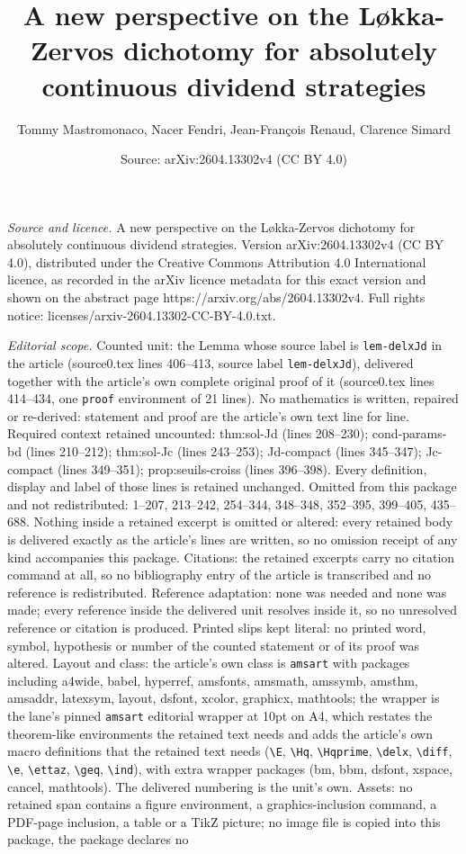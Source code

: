 \documentclass[10pt,a4paper]{amsart}
\title[A new perspective on the L{\o}kka-Zervos dichotomy for absol]{A new perspective on the L{\o}kka-Zervos dichotomy for absolutely continuous dividend strategies}
\author{Tommy Mastromonaco, Nacer Fendri, Jean-Fran\c{c}ois Renaud, Clarence Simard}
\date{Source: arXiv:2604.13302v4 (CC BY 4.0)}
\begin{document}
\maketitle

\noindent\emph{Source and licence.} A new perspective on the L{\o}kka-Zervos dichotomy for absolutely continuous dividend strategies. Version arXiv:2604.13302v4 (CC BY 4.0), distributed under the Creative Commons Attribution 4.0 International licence, as recorded in the arXiv licence metadata for this exact version and shown on the abstract page https://arxiv.org/abs/2604.13302v4. Full rights notice: licenses/arxiv-2604.13302-CC-BY-4.0.txt.\par\smallskip

\noindent\textit{Editorial scope.} Counted unit: the Lemma whose source label is \texttt{lem-delxJd} in the article (source0.tex lines 406--413, source label \texttt{lem-delxJd}), delivered together with the article's own complete original proof of it (source0.tex lines 414--434, one \texttt{proof} environment of 21 lines). No mathematics is written, repaired or re-derived: statement and proof are the article's own text line for line. Required context retained uncounted: thm:sol-Jd (lines 208--230); cond-params-bd (lines 210--212); thm:sol-Jc (lines 243--253); Jd-compact (lines 345--347); Jc-compact (lines 349--351); prop:seuils-croiss (lines 396--398). Every definition, display and label of those lines is retained unchanged. Omitted from this package and not redistributed: 1--207, 213--242, 254--344, 348--348, 352--395, 399--405, 435--688. Nothing inside a retained excerpt is omitted or altered: every retained body is delivered exactly as the article's lines are written, so no omission receipt of any kind accompanies this package. Citations: the retained excerpts carry no citation command at all, so no bibliography entry of the article is transcribed and no reference is redistributed. Reference adaptation: none was needed and none was made; every reference inside the delivered unit resolves inside it, so no unresolved reference or citation is produced. Printed slips kept literal: no printed word, symbol, hypothesis or number of the counted statement or of its proof was altered. Layout and class: the article's own class is \texttt{amsart} with packages including a4wide, babel, hyperref, amsfonts, amsmath, amssymb, amsthm, amsaddr, latexsym, layout, dsfont, xcolor, graphicx, mathtools; the wrapper is the lane's pinned \texttt{amsart} editorial wrapper at 10pt on A4, which restates the theorem-like environments the retained text needs and adds the article's own macro definitions that the retained text needs (\texttt{\textbackslash E}, \texttt{\textbackslash Hq}, \texttt{\textbackslash Hqprime}, \texttt{\textbackslash delx}, \texttt{\textbackslash diff}, \texttt{\textbackslash e}, \texttt{\textbackslash ettaz}, \texttt{\textbackslash geq}, \texttt{\textbackslash ind}), with extra wrapper packages (bm, bbm, dsfont, xspace, cancel, mathtools). The delivered numbering is the unit's own. Assets: no retained span contains a figure environment, a graphics-inclusion command, a PDF-page inclusion, a table or a TikZ picture; no image file is copied into this package, the package declares no 
\end{document}
